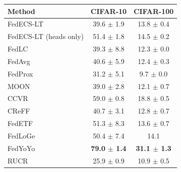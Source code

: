 \begin{tabular}{lcc}
\toprule
Method & CIFAR-10 & CIFAR-100\\
\midrule
FedECS-LT & 39.6 $\pm$ 1.9 & 13.8 $\pm$ 0.4\\
FedECS-LT (heads only) & 51.4 $\pm$ 1.8 & 14.5 $\pm$ 0.2\\
FedLC & 39.3 $\pm$ 8.8 & 12.3 $\pm$ 0.0\\
FedAvg & 40.6 $\pm$ 5.9 & 12.4 $\pm$ 0.3\\
FedProx & 31.2 $\pm$ 5.1 & 9.7 $\pm$ 0.0\\
MOON & 39.0 $\pm$ 2.8 & 12.1 $\pm$ 0.7\\
CCVR & 59.0 $\pm$ 0.8 & 18.8 $\pm$ 0.5\\
CReFF & 40.7 $\pm$ 3.1 & 12.8 $\pm$ 0.7\\
FedETF & 51.3 $\pm$ 8.3 & 13.6 $\pm$ 0.7\\
FedLoGe & 50.4 $\pm$ 7.4 & 14.1\\
FedYoYo & \textbf{79.0 $\pm$ 1.4} & \textbf{31.1 $\pm$ 1.3}\\
RUCR & 25.9 $\pm$ 0.9 & 10.9 $\pm$ 0.5\\
\bottomrule
\end{tabular}
